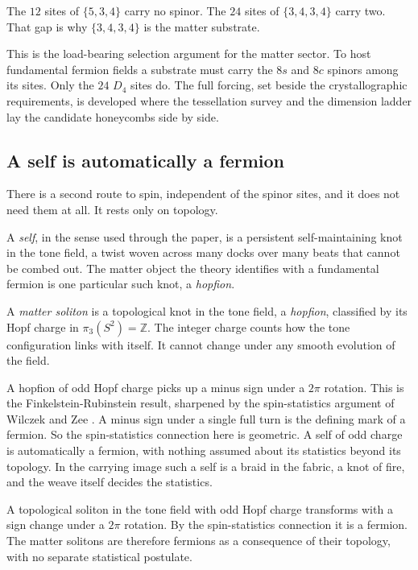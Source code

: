 \begin{result}
The $12$ sites of $\{5,3,4\}$ carry no spinor. The $24$ sites of $\{3,4,3,4\}$ carry two. That gap is why
$\{3,4,3,4\}$ is the matter substrate.
\end{result}

This is the load-bearing selection argument for the matter sector. To host fundamental fermion fields a
substrate must carry the $8s$ and $8c$ spinors among its sites. Only the $24$ $D_4$ sites do. The full forcing,
set beside the crystallographic requirements, is developed where the tessellation survey and the dimension
ladder lay the candidate honeycombs side by side.

\subsection{A self is automatically a fermion}

There is a second route to spin, independent of the spinor sites, and it does not need them at all. It rests only
on topology.

A \emph{self}, in the sense used through the paper, is a persistent self-maintaining knot in the tone field, a
twist woven across many docks over many beats that cannot be combed out. The matter object the theory identifies
with a fundamental fermion is one particular such knot, a \emph{hopfion}.

\begin{definition}
A \emph{matter soliton} is a topological knot in the tone field, a \emph{hopfion}, classified by its Hopf charge
in $\pi_3(S^2) = \mathbb{Z}$. The integer charge counts how the tone configuration links with itself. It cannot
change under any smooth evolution of the field.
\end{definition}

A hopfion of odd Hopf charge picks up a minus sign under a $2\pi$ rotation. This is the Finkelstein-Rubinstein
result, sharpened by the spin-statistics argument of Wilczek and Zee \cite{finkelsteinrubinstein1968,
wilczekzee1983}. A minus sign under a single full turn is the defining mark of a fermion. So the spin-statistics
connection here is geometric. A self of odd charge is automatically a fermion, with nothing assumed about its
statistics beyond its topology. In the carrying image such a self is a braid in the fabric, a knot of fire, and
the weave itself decides the statistics.

\begin{proposition}
A topological soliton in the tone field with odd Hopf charge transforms with a sign change under a $2\pi$
rotation. By the spin-statistics connection it is a fermion. The matter solitons are therefore fermions as a
consequence of their topology, with no separate statistical postulate.
\end{proposition}

